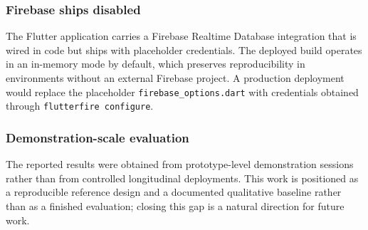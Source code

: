 \subsubsection{Firebase ships disabled}
The Flutter application carries a Firebase Realtime Database
integration that is wired in code but ships with placeholder
credentials. The deployed build operates in an in-memory mode by
default, which preserves reproducibility in environments without an
external Firebase project. A production deployment would replace the
placeholder \texttt{firebase\_options.dart} with credentials
obtained through \texttt{flutterfire configure}.

\subsubsection{Demonstration-scale evaluation}
The reported results were obtained from prototype-level
demonstration sessions rather than from controlled longitudinal
deployments. This work is positioned as a reproducible reference
design and a documented qualitative baseline rather than as a
finished evaluation; closing this gap is a natural direction for
future work.
